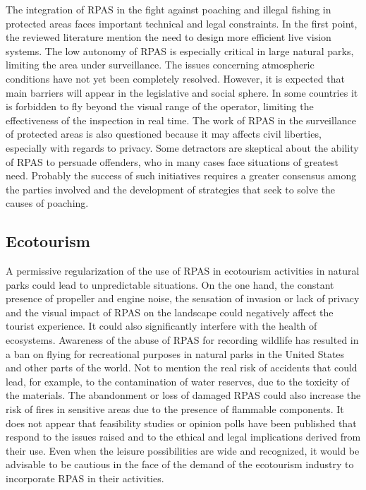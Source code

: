 \documentclass[]{interact}
\theoremstyle{plain}%
\theoremstyle{definition}
\theoremstyle{remark}
\begin{document}
The integration of RPAS in the fight against poaching and illegal
fishing in protected areas faces important technical and legal
constraints. In the first point, the reviewed literature mention the
need to design more efficient live vision systems. The low autonomy of
RPAS is especially critical in large natural parks, limiting the area
under surveillance. The issues concerning atmospheric conditions have
not yet been completely resolved. However, it is expected that main
barriers will appear in the legislative and social sphere. In some
countries it is forbidden to fly beyond the visual range of the
operator, limiting the effectiveness of the inspection in real time. The
work of RPAS in the surveillance of protected areas is also questioned
because it may affects civil liberties, especially with regards to
privacy. Some detractors are skeptical about the ability of RPAS to
persuade offenders, who in many cases face situations of greatest need.
Probably the success of such initiatives requires a greater consensus
among the parties involved and the development of strategies that seek
to solve the causes of poaching.

\subsection{Ecotourism}\label{ecotourism-1}

A permissive regularization of the use of RPAS in ecotourism activities
in natural parks could lead to unpredictable situations. On the one
hand, the constant presence of propeller and engine noise, the sensation
of invasion or lack of privacy and the visual impact of RPAS on the
landscape could negatively affect the tourist experience. It could also
significantly interfere with the health of ecosystems. Awareness of the
abuse of RPAS for recording wildlife has resulted in a ban on flying for
recreational purposes in natural parks in the United States and other
parts of the world. Not to mention the real risk of accidents that could
lead, for example, to the contamination of water reserves, due to the
toxicity of the materials. The abandonment or loss of damaged RPAS could
also increase the risk of fires in sensitive areas due to the presence
of flammable components. It does not appear that feasibility studies or
opinion polls have been published that respond to the issues raised and
to the ethical and legal implications derived from their use. Even when
the leisure possibilities are wide and recognized, it would be advisable
to be cautious in the face of the demand of the ecotourism industry to
incorporate RPAS in their activities.
\end{document}
